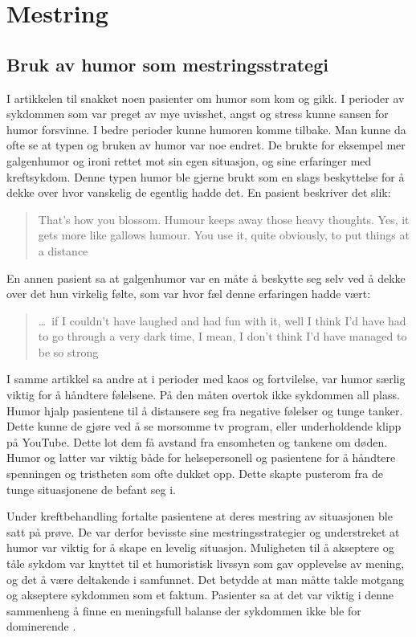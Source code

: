\section{Mestring}

\subsection{Bruk av humor som mestringsstrategi}

I artikkelen til  snakket noen pasienter om humor som kom
og gikk. I perioder av sykdommen som var preget av mye uvisshet, angst og
stress kunne sansen for humor forsvinne. I bedre perioder kunne humoren komme
tilbake.  Man kunne da ofte se at typen og bruken av humor var noe endret. De
brukte for eksempel mer galgenhumor og ironi rettet mot sin egen situasjon, og
sine erfaringer med kreftsykdom. Denne typen humor ble gjerne brukt som en
slags beskyttelse for å dekke over hvor vanskelig de egentlig hadde det. En
pasient beskriver det slik: \blockquote[{}]{That's
how you blossom. Humour keeps away those heavy thoughts. Yes, it gets more like
gallows humour. You use it, quite obviously, to put things at a distance}.

En annen pasient sa at galgenhumor var en måte å beskytte seg selv ved å dekke
over det hun virkelig følte, som var hvor fæl denne erfaringen hadde vært:
\blockquote[{}]{\ldots\ if I couldn't have laughed
and had fun with it, well I think I'd have had to go through a very dark time,
I mean, I don't think I'd have managed to be so strong}.

I samme artikkel sa andre at i perioder med kaos og fortvilelse, var humor
særlig viktig for å håndtere følelsene. På den måten overtok ikke sykdommen all
plass. Humor hjalp pasientene til å distansere seg fra negative følelser og
tunge tanker. Dette kunne de gjøre ved å se morsomme tv program, eller
underholdende klipp på YouTube. Dette lot dem få avstand fra ensomheten og
tankene om døden. Humor og latter var viktig både for helsepersonell og
pasientene for å håndtere spenningen og tristheten som ofte dukket opp. Dette
skapte pusterom fra de tunge situasjonene de befant seg i.

Under kreftbehandling fortalte pasientene at deres mestring av situasjonen ble
satt på prøve. De var derfor bevisste sine mestringsstrategier og understreket
at humor var viktig for å skape en levelig situasjon. Muligheten til å
akseptere og tåle sykdom var knyttet til et humoristisk livssyn som gav
opplevelse av mening, og det å være deltakende i samfunnet. Det betydde at man
måtte takle motgang og akseptere sykdommen som et faktum. Pasienter sa at det
var viktig i denne sammenheng å finne en meningsfull balanse der sykdommen ikke
ble for dominerende \cite{roaldsen2015}.

